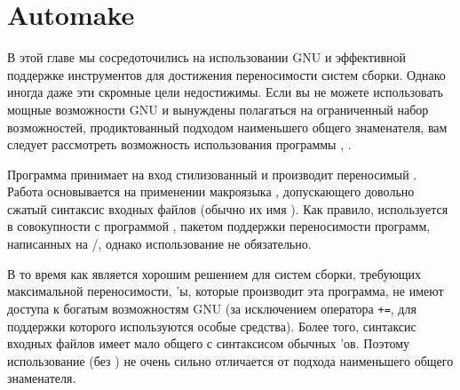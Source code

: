 \section{Automake}

В этой главе мы сосредоточились на использовании GNU \GNUmake{} и
эффективной поддержке инструментов для достижения переносимости систем
сборки. Однако иногда даже эти скромные цели недостижимы. Если вы не
можете использовать мощные возможности GNU \GNUmake{} и вынуждены
полагаться на ограниченный набор возможностей, продиктованный подходом
наименьшего общего знаменателя, вам следует рассмотреть
возможность использования программы ,
.


Программа  принимает на вход стилизованный
\Makefile{} и производит переносимый \Makefile{}. Работа
 основывается на применении макроязыка ,
допускающего довольно сжатый синтаксис входных файлов (обычно их имя
). Как правило,  используется
в совокупности с программой , пакетом поддержки
переносимости программ, написанных на \Clang{}/\Cplusplus{}, однако
использование  не обязательно.

В то время как  является хорошим решением для систем
сборки, требующих максимальной переносимости, \Makefile{}'ы, которые
производит эта программа, не имеют доступа к богатым возможностям GNU
\GNUmake{} (за исключением оператора \texttt{+=}, для поддержки
которого используются особые средства). Более того, синтаксис входных
файлов  имеет мало общего с синтаксисом обычных
\Makefile{}'ов. Поэтому использование 
(без ) не очень сильно отличается от подхода
наименьшего общего знаменателя.
